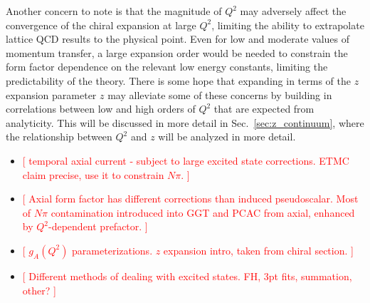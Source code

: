 Another concern to note is that the magnitude of $Q^2$ may adversely affect
 the convergence of the chiral expansion at large $Q^2$,
 limiting the ability to extrapolate lattice QCD results to the physical point.
Even for low and moderate values of momentum transfer,
 a large expansion order would be needed to constrain the form factor
 dependence on the relevant low energy constants,
 limiting the predictability of the theory.
There is some hope that expanding in terms of the $z$ expansion parameter $z$
 may alleviate some of these concerns by building in correlations between
 low and high orders of $Q^2$ that are expected from analyticity.
This will be discussed in more detail in Sec.~\ref{sec:z_continuum},
 where the relationship between $Q^2$ and $z$ will be analyzed in more detail.

\begin{itemize}
\item
\textcolor{red}{[
 temporal axial current - subject to large excited state corrections.
 ETMC claim precise, use it to constrain $N\pi$.
]}
\item
\textcolor{red}{[
 Axial form factor has different corrections than induced pseudoscalar.
 Most of $N\pi$ contamination introduced into GGT and PCAC from axial,
 enhanced by $Q^2$-dependent prefactor.
]}
\item
\textcolor{red}{[
 $g_A(Q^2)$ parameterizations.
 $z$ expansion intro, taken from chiral section.
]}
\item
\textcolor{red}{[
 Different methods of dealing with excited states.
 FH, 3pt fits, summation, other?
]}
\end{itemize}

